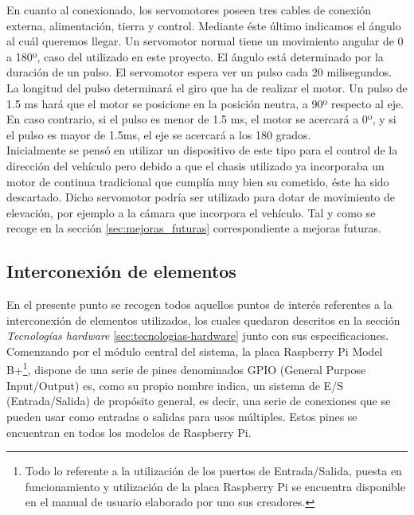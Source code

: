 En cuanto al conexionado, los servomotores poseen tres cables de conexión externa, alimentación, tierra y control. Mediante éste último indicamos el ángulo al cuál queremos llegar. 
Un servomotor normal tiene un movimiento angular de 0 a 180º, caso del utilizado en este proyecto. El ángulo está determinado por la duración de un pulso. El servomotor 
espera ver un pulso cada 20 milisegundos. La longitud del pulso determinará el giro que ha de realizar el motor. Un pulso de 1.5 ms hará que el motor se posicione en la posición 
neutra, a 90º respecto al eje. En caso contrario, si el pulso es menor de 1.5 ms,  el motor se acercará a 0º, y si el pulso es mayor de 1.5ms, el eje se acercará a los 180 grados.\\

Inicialmente se pensó en utilizar un dispositivo de este tipo para el control de la dirección del vehículo pero debido a que el chasis utilizado ya incorporaba un motor de continua tradicional
que cumplía muy bien su cometido, éste ha sido descartado. Dicho servomotor podría ser utilizado para dotar de movimiento de elevación, por ejemplo a la cámara que incorpora el vehículo. Tal y como
se recoge en la sección \ref{sec:mejoras_futuras} correspondiente a mejoras futuras.\\

\subsection{Interconexión de elementos}

En el presente punto se recogen todos aquellos puntos de interés referentes a la interconexión de elementos utilizados, los cuales quedaron descritos en la sección \emph{Tecnologías hardware}
\ref{sec:tecnologias-hardware} junto con sus especificaciones.\\

Comenzando por el módulo central del sistema, la placa Raspberry Pi Model B+\footnote{ Todo lo referente a la utilización de los puertos de Entrada/Salida, puesta en funcionamiento y
utilización de la placa Raspberry Pi se encuentra disponible en el manual de usuario \cite{book:Raspberry} elaborado por uno sus creadores. }, dispone de una serie de pines denominados GPIO (General Purpose Input/Output) es, como su propio nombre indica, 
un sistema de E/S (Entrada/Salida) de propósito general, es decir, una serie de conexiones que se pueden usar como entradas o salidas para usos múltiples. Estos pines se encuentran en todos
los modelos de Raspberry Pi.\\

